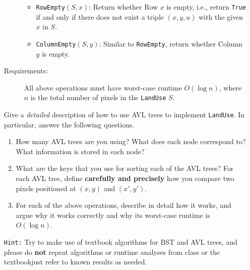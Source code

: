 \documentclass{assignment-263}
\begin{document}
\begin{enumerate}
\begin{description}
\begin{itemize}
			\item	\texttt{RowEmpty}$(S, x)$: Return whether Row $x$ is
					empty, i.e., return \texttt{True} if and only
					if there does not exist a triple $(x, y, u)$ with
					the given $x$ in $S$.
			\item	\texttt{ColumnEmpty}$(S, y)$: Similar to
					\texttt{RowEmpty}, return whether Column $y$ is empty.
			\end{itemize}

		\item[Requirements:]
				All above operations must have worst-case runtime
				$O(\log n)$, where $n$ is the total number of
				pixels in the \texttt{LandUse} $S$.
		\end{description}

		Give a \emph{detailed} description of how to use AVL trees to
		implement \texttt{LandUse}. In particular, answer the following
		questions.
		\begin{enumerate}
		\item	How many AVL trees are you using? What does each node
			correspond to? What information is stored in each node?
		\item	What are the keys that you use for sorting each of the AVL
			trees? For each AVL tree, define \textbf{carefully and
			precisely} how you compare two pixels positioned at $(x, y)$ and
			$(x', y')$.
		\item	For each of the above operations, describe in detail how
				it works, and argue why it works correctly and why its
				worst-case runtime is $O(\log n)$.
		\end{enumerate}
		\texttt{Hint:} Try to make use of textbook algorithms for BST and AVL
		trees, and please do \textbf{not} repeat algorithms or runtime
		analyses from class or the textbook\textemdash just refer to known results
		as needed. \hfill \break


\end{enumerate}

\program
\end{document}
